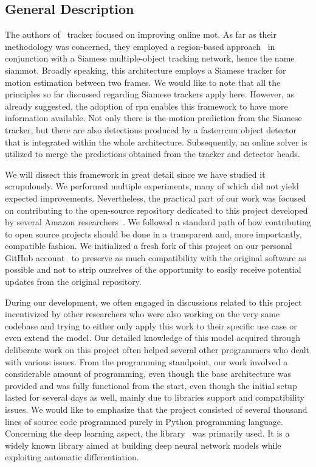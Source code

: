 
\subsection{General Description}

The authors of~\cite{shuai2021siammot} tracker focused on improving online \gls{mot}. As far as their methodology was concerned, they employed a region-based approach~\cite{ren2017fasterrcnn} in conjunction with a Siamese multiple-object tracking network, hence the name \gls{siammot}. Broadly speaking, this architecture employs a Siamese tracker for motion estimation between two frames. We would like to note that all the principles so far discussed regarding Siamese trackers apply here. However, as already suggested, the adoption of \gls{rpn} enables this framework to have more information available. Not only there is the motion prediction from the Siamese tracker, but there are also detections produced by a \gls{fasterrcnn} object detector~\cite{ren2017fasterrcnn} that is integrated within the whole architecture. Subsequently, an online solver is utilized to merge the predictions obtained from the tracker and detector heads.

We will dissect this framework in great detail since we have studied it scrupulously. We performed multiple experiments, many of which did not yield expected improvements. Nevertheless, the practical part of our work was focused on contributing to the open-source repository dedicated to this project developed by several Amazon researchers~\cite{websiammotoriggithub}. We followed a standard path of how contributing to open source projects should be done in a transparent and, more importantly, compatible fashion. We initialized a fresh fork of this project on our personal GitHub account~\cite{websiammotforkgithub} to preserve as much compatibility with the original software as possible and not to strip ourselves of the opportunity to easily receive potential updates from the original repository.

During our development, we often engaged in discussions related to this project incentivized by other researchers who were also working on the very same codebase and trying to either only apply this work to their specific use case or even extend the model. Our detailed knowledge of this model acquired through deliberate work on this project often helped several other programmers who dealt with various issues. From the programming standpoint, our work involved a considerable amount of programming, even though the base architecture was provided and was fully functional from the start, even though the initial setup lasted for several days as well, mainly due to libraries support and compatibility issues. We would like to emphasize that the project consisted of several thousand lines of source code programmed purely in Python programming language. Concerning the deep learning aspect, the \pytorch{} library~\cite{paszke2019pytorch} was primarily used. It is a widely known library aimed at building deep neural network models while exploiting automatic differentiation.

